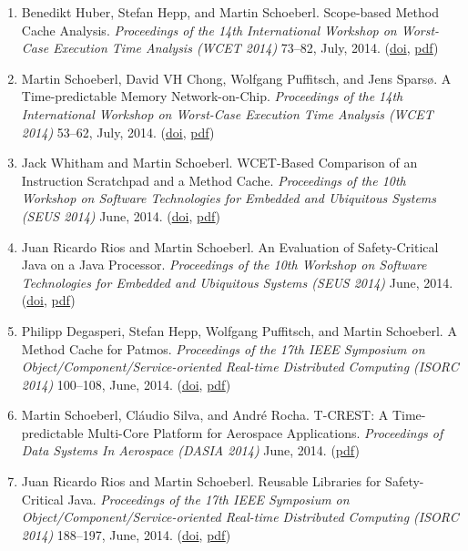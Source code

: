 \begin{enumerate}
\item Benedikt Huber, Stefan Hepp, and Martin Schoeberl.
 Scope-based Method Cache Analysis.
 \emph{Proceedings of the 14th International Workshop on Worst-Case Execution Time Analysis (WCET 2014)} 73--82, July, 2014.
(\href{http://dx.doi.org/10.4230/OASIcs.WCET.2014.73}{doi}, \href{http://www.jopdesign.com/doc/mcana.pdf}{pdf})

\item Martin Schoeberl, David VH Chong, Wolfgang Puffitsch, and Jens Spars{\o}.
 A Time-predictable Memory Network-on-Chip.
 \emph{Proceedings of the 14th International Workshop on Worst-Case Execution Time Analysis (WCET 2014)} 53--62, July, 2014.
(\href{http://dx.doi.org/10.4230/OASIcs.WCET.2014.53}{doi}, \href{http://www.jopdesign.com/doc/memnoc.pdf}{pdf})

\item Jack Whitham and Martin Schoeberl.
 WCET-Based Comparison of an Instruction Scratchpad and a Method Cache.
 \emph{Proceedings of the 10th Workshop on Software Technologies for Embedded and Ubiquitous Systems (SEUS 2014)} June, 2014.
(\href{http://dx.doi.org/10.1109/ISORC.2014.48}{doi}, \href{http://www.jopdesign.com/doc/spmvsmc.pdf}{pdf})

\item Juan Ricardo Rios and Martin Schoeberl.
 An Evaluation of Safety-Critical Java on a Java Processor.
 \emph{Proceedings of the 10th Workshop on Software Technologies for Embedded and Ubiquitous Systems (SEUS 2014)} June, 2014.
(\href{http://dx.doi.org/10.1109/ISORC.2014.41}{doi}, \href{http://www.jopdesign.com/doc/jopscjeval.pdf}{pdf})

\item Philipp Degasperi, Stefan Hepp, Wolfgang Puffitsch, and Martin Schoeberl.
 A Method Cache for Patmos.
 \emph{Proceedings of the 17th IEEE Symposium on Object/Component/Service-oriented Real-time Distributed Computing (ISORC 2014)} 100--108, June, 2014.
(\href{http://dx.doi.org/10.1109/ISORC.2014.47}{doi}, \href{http://www.jopdesign.com/doc/mcpat.pdf}{pdf})

\item Martin Schoeberl, Cl\'{a}udio Silva, and Andr\'{e} Rocha.
 T-CREST: A Time-predictable Multi-Core Platform for Aerospace Applications.
 \emph{Proceedings of Data Systems In Aerospace (DASIA 2014)} June, 2014.
(\href{http://www.jopdesign.com/doc/t-crest-dasia.pdf}{pdf})

\item Juan Ricardo Rios and Martin Schoeberl.
 Reusable Libraries for Safety-Critical Java.
 \emph{Proceedings of the 17th IEEE Symposium on Object/Component/Service-oriented Real-time Distributed Computing (ISORC 2014)} 188--197, June, 2014.
(\href{http://dx.doi.org/10.1109/ISORC.2014.27}{doi}, \href{http://www.jopdesign.com/doc/scjlibs.pdf}{pdf})



\end{enumerate}
